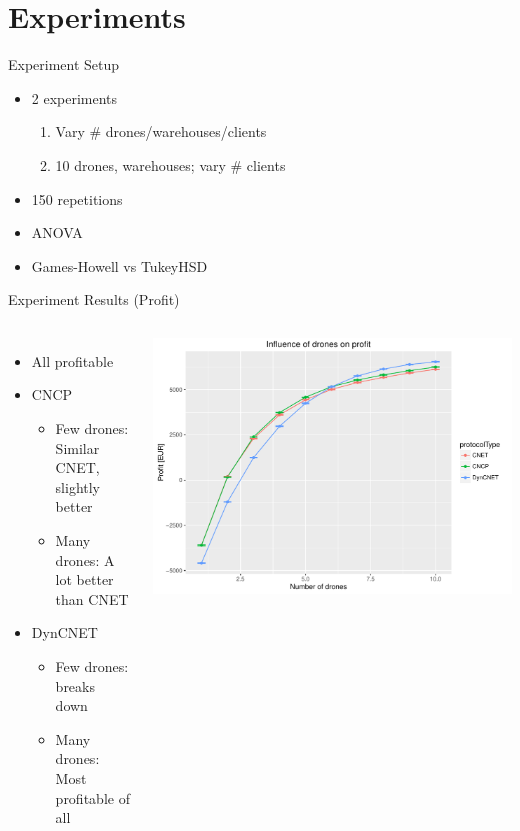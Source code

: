 \documentclass[notes]{beamer}
\begin{document}
	\section{Experiments}
	\begin{frame}{Experiment Setup}
		\begin{itemize}
			\item 2 experiments
				\begin{enumerate}
				\item Vary \# drones/warehouses/clients
				\item 10 drones, warehouses; vary \# clients
				\end{enumerate}
			\item 150 repetitions
			\item ANOVA
			\item Games-Howell vs TukeyHSD
		\end{itemize}
	\end{frame}
	\begin{frame}{Experiment Results (Profit)}
		\begin{columns}[c]
			\begin{itemize}
				\item All profitable
				\item CNCP
					\begin{itemize}
					\item Few drones: Similar CNET, slightly better
					\item Many drones: A lot better than CNET
					\end{itemize}
				\item DynCNET
				\begin{itemize}
					\item Few drones: breaks down
					\item Many drones: Most profitable of all
				\end{itemize}
			\end{itemize}
			
			\includegraphics[width=\columnwidth]{drones-profit}
		\end{columns}
	\end{frame}
\end{document}
